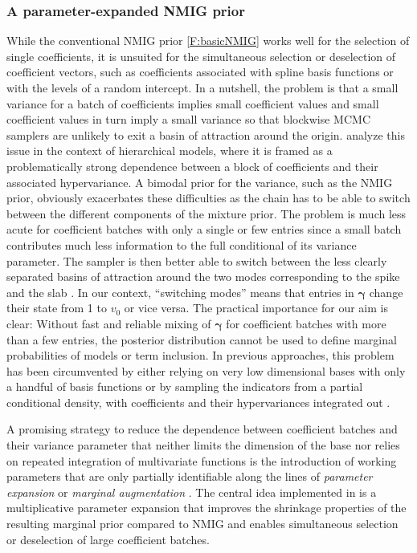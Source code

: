 \documentclass[article, shortnames, nojss, noheadings, notitle]{jss}
\begin{document}
\subsubsection*{A parameter-expanded NMIG prior}
While the conventional NMIG prior \eqref{F:basicNMIG} works well for the selection of single coefficients,
it is unsuited for the simultaneous selection or deselection of coefficient vectors, such as coefficients associated with
spline basis functions or with the levels of a random intercept. In a nutshell,
the problem is that a small variance for a batch of
coefficients implies small coefficient values and small coefficient
values in turn imply a small variance so that blockwise MCMC samplers are
unlikely to exit a basin of attraction around the origin. \citet{Gelman:2008}
analyze this issue in the context of hierarchical models, where
it is framed as a problematically strong dependence between a block of
coefficients and their associated hypervariance. A bimodal prior for
the variance, such as the NMIG prior, obviously exacerbates these
difficulties as the chain has to be able to switch between the different components of the mixture prior.
The problem is much less acute for coefficient batches with only a single or few entries since
a small batch contributes much less information to the full conditional of its variance parameter.
The sampler is then better able to switch between the less clearly separated basins of attraction around
the two modes corresponding to the spike and the slab \citep[Section 3.2]{Scheipl:2010}.
In our context, ``switching modes'' means that
entries in $\bm\gamma$ change their state from 1 to $v_0$ or vice versa.
The practical importance for our aim is clear: Without fast and reliable mixing
of $\bm\gamma$ for coefficient batches with more than a few entries, the posterior distribution cannot be used to define marginal probabilities of models or
term inclusion.
In previous approaches, this problem has been circumvented by either relying on very low dimensional bases with only
a handful of basis functions \citep{Reich:Storlie:Bondell:2009,Cottet:Kohn:Nott:2008} or by sampling the indicators from a
partial conditional density, with coefficients and their hypervariances integrated out \citep{Yau:Kohn:Wood:2003}.

A promising strategy to reduce the dependence between coefficient batches
and their variance parameter that neither limits the dimension of the base nor
relies on repeated integration of multivariate functions is the
introduction of working parameters that are only partially
identifiable along the lines of \emph{parameter expansion} or
\emph{marginal augmentation} \citep{Meng:Dyk:1997, Gelman:2008}.
The central idea implemented in  is
a multiplicative parameter expansion
that improves the shrinkage properties of the resulting
marginal prior compared to NMIG \citep[Section 3.4]{Scheipl:2010} and
enables simultaneous selection or deselection of large coefficient
batches.
\end{document}
